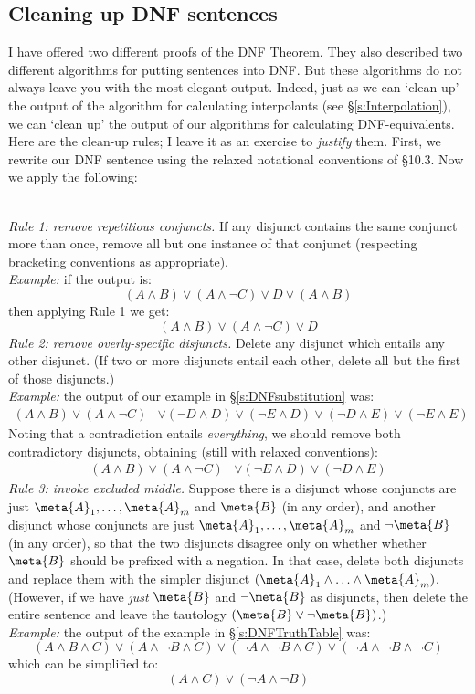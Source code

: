\subsection{Cleaning up DNF sentences}\label{s:DNFCleanUp}
I have offered two different proofs of the DNF Theorem. They also described two different algorithms for putting sentences into DNF. But these algorithms do not always leave you with the most elegant output. Indeed, just as we can `clean up' the output of the algorithm for calculating interpolants (see \S\ref{s:Interpolation}), we can `clean up' the output of our algorithms for calculating DNF-equivalents. Here are the clean-up rules; I leave it as an exercise to \emph{justify} them. First, we rewrite our DNF sentence using the relaxed notational conventions of \forallxref{} \S10.3. Now we apply the following:

\
\\\emph{Rule 1: remove repetitious conjuncts.}  If any disjunct contains the same conjunct more than once, remove all but one instance of that conjunct (respecting bracketing conventions as appropriate).
\\\emph{Example:} if the output is:
$$(A \land B) \lor (A \land \lnot C) \lor D \lor (A \land B)$$
then applying Rule 1 we get:
$$(A \land B) \lor (A \land \lnot C) \lor D$$
\noindent \emph{Rule 2: remove overly-specific disjuncts.} Delete any disjunct which entails any other disjunct. (If two or more disjuncts entail each other, delete all but the first of those disjuncts.)
\\\emph{Example:} the output of our example in \S\ref{s:DNFsubstitution} was:
		\begin{align*}
		(A \land B) \lor (A \land \lnot C) &\lor  (\lnot D \land D) \lor (\lnot E \land D) \lor (\lnot D \land E) \lor (\lnot E \land  E)		
		\end{align*}
		Noting that a contradiction entails \emph{everything}, we should remove both contradictory disjuncts, obtaining (still with relaxed conventions):
		\begin{align*}
		(A \land B) \lor (A \land \lnot C) &\lor  (\lnot E \land D) \lor (\lnot D \land E)
		\end{align*}		
\emph{Rule 3: invoke excluded middle.} Suppose there is a disjunct whose conjuncts are just $\meta{A}_1, \ldots,  \meta{A}_m$ and $\meta{B}$ (in any order), and another disjunct whose conjuncts are just $\meta{A}_1, \ldots, \meta{A}_m$ and $\lnot \meta{B}$ (in any order), so that the two disjuncts disagree only on whether whether $\meta{B}$ should be prefixed with a negation. In that case, delete both disjuncts and replace them with the simpler disjunct $(\meta{A}_1 \land \ldots \land \meta{A}_m)$. (However, if we have \emph{just} $\meta{B}$ and $\lnot\meta{B}$ as disjuncts, then delete the entire sentence and leave the tautology $(\meta{B} \lor \lnot \meta{B})$.)
\\\emph{Example:} the output of the example in \S\ref{s:DNFTruthTable} was:
		$$(A \land B \land C) \lor (A \land \lnot B \land C) \lor (\lnot A \land \lnot B \land C) \lor (\lnot A \land \lnot B \land \lnot C)$$
			which can be simplified to:
		$$(A \land C) \lor (\lnot A \land \lnot B)$$


